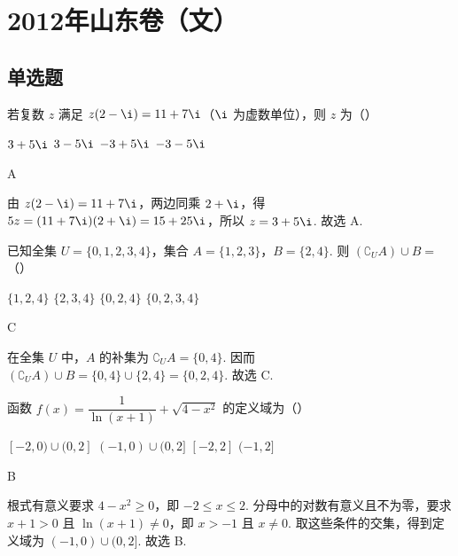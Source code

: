 \chapter{2012年山东卷（文）}

\section{单选题}

\begin{problem}
若复数 \(z\) 满足 \(z(2-\i)=11+7\i\)（\(\i\) 为虚数单位），则 \(z\) 为（\quad）

\choices
    {\(3+5\i\)}
    {\(3-5\i\)}
    {\(-3+5\i\)}
    {\(-3-5\i\)}
\end{problem}

\begin{answer}
A
\end{answer}

\begin{solution}
由 \(z(2-\i)=11+7\i\)，两边同乘 \(2+\i\)，得 \(5z=(11+7\i)(2+\i)=15+25\i\)，所以 \(z=3+5\i\). 故选 A.
\end{solution}

\begin{problem}
已知全集 \(U=\{0,1,2,3,4\}\)，集合 \(A=\{1,2,3\}\)，\(B=\{2,4\}\). 则 \(\left(\complement_U A\right)\cup B=\)（\quad）

\choices
    {\(\{1,2,4\}\)}
    {\(\{2,3,4\}\)}
    {\(\{0,2,4\}\)}
    {\(\{0,2,3,4\}\)}
\end{problem}

\begin{answer}
C
\end{answer}

\begin{solution}
在全集 \(U\) 中，\(A\) 的补集为 \(\complement_U A=\{0,4\}\). 因而 \(\left(\complement_U A\right)\cup B=\{0,4\}\cup\{2,4\}=\{0,2,4\}\). 故选 C.
\end{solution}

\begin{problem}
函数 \(f(x)=\dfrac{1}{\ln(x+1)}+\sqrt{4-x^2}\) 的定义域为（\quad）

\choices
    {\([-2,0)\cup(0,2]\)}
    {\((-1,0)\cup(0,2]\)}
    {\([-2,2]\)}
    {\((-1,2]\)}
\end{problem}

\begin{answer}
B
\end{answer}

\begin{solution}
根式有意义要求 \(4-x^2\geqslant0\)，即 \(-2\leqslant x\leqslant2\). 分母中的对数有意义且不为零，要求 \(x+1>0\) 且 \(\ln(x+1)\neq0\)，即 \(x>-1\) 且 \(x\neq0\). 取这些条件的交集，得到定义域为 \((-1,0)\cup(0,2]\). 故选 B.
\end{solution}

